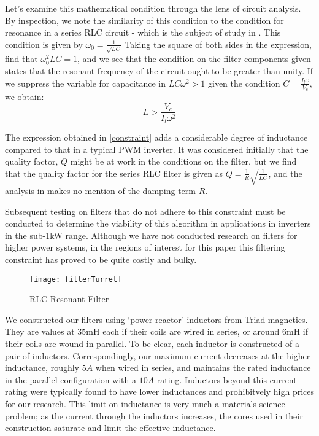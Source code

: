 Let's examine this mathematical condition through the lens of circuit analysis. By inspection, we note the similarity of this condition to the condition for resonance in a series RLC circuit - which is the subject of study in \cite{ricardo}. This condition is given by $\omega_0 = \frac{1}{\sqrt{LC}}$ Taking the square of both sides in the expression, find that $\omega_0^2LC=1$, and we see that the condition on the filter components given states that the resonant frequency of the circuit ought to be greater than unity. If we suppress the variable for capacitance in 
$LC\omega^2>1$ given the condition $C=\frac{I_l\omega}{V_c}$, we obtain:
\begin{equation}
\label{constraint}
L > \frac{V_c}{I_l\omega^2}
\end{equation}

The expression obtained in \ref{constraint} adds a considerable degree of inductance compared to that in a typical PWM inverter. It was considered initially that the quality factor, $Q$ might be at work in the conditions on the filter, but we find that the quality factor for the series RLC filter is given as $Q = \frac{1}{R}\sqrt{\frac{1}{LC}}$, and the analysis in \cite{ricardo} makes no mention of the damping term $R$. 

Subsequent testing on filters that do not adhere to this constraint must be conducted to determine the viability of this algorithm in applications in inverters in the sub-1kW range. Although we have not conducted research on filters for higher power systems, in the regions of interest for this paper this filtering constraint has proved to be quite costly and bulky. 

\begin{figure}[h]
\centering
\texttt{[image: filterTurret]}
\caption{RLC Resonant Filter}
\label{filterTurret}
\end{figure}

We constructed our filters using `power reactor' inductors from Triad magnetics. They are values at 35mH each if their coils are wired in series, or around 6mH if their coils are wound in parallel. To be clear, each inductor is constructed of a pair of inductors. Correspondingly, our maximum current decreases at the higher inductance, roughly $5A$ when wired in series, and maintains the rated inductance in the parallel configuration with a $10A$ rating. Inductors beyond this current rating were typically found to have lower inductances and prohibitvely high prices for our research. This limit on inductance is very much a materials science problem; as the current through the inductors increases, the cores used in their construction saturate and limit the effective inductance. 

